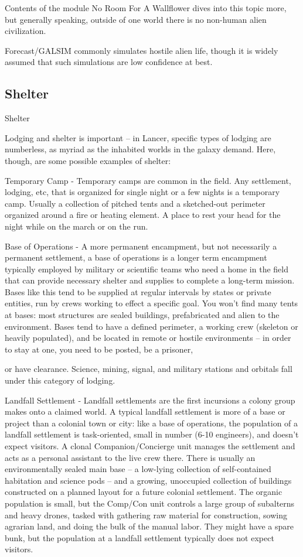 Contents of the module No Room For A Wallflower dives into this topic more, but generally
speaking, outside of one world there is no non-human alien civilization.


Forecast/GALSIM commonly simulates hostile alien life, though it is widely assumed that such
simulations are low confidence at best.

\subsection{Shelter}
Shelter

Lodging and shelter is important -- in Lancer, specific types of lodging are numberless, as myriad
as the inhabited worlds in the galaxy demand. Here, though, are some possible examples of
shelter:


Temporary Camp - Temporary camps are common in the field. Any settlement, lodging, etc, that
is organized for single night or a few nights is a temporary camp. Usually a collection of pitched
tents and a sketched-out perimeter organized around a fire or heating element. A place to rest
your head for the night while on the march or on the run.


Base of Operations - A more permanent encampment, but not necessarily a permanent
settlement, a base of operations is a longer term encampment typically employed by military or
scientific teams who need a home in the field that can provide necessary shelter and supplies to
complete a long-term mission. Bases like this tend to be supplied at regular intervals by states or
private entities, run by crews working to effect a specific goal. You won’t find many tents at
bases: most structures are sealed buildings, prefabricated and alien to the environment. Bases
tend to have a defined perimeter, a working crew (skeleton or heavily populated), and be located
in remote or hostile environments -- in order to stay at one, you need to be posted, be a prisoner,




or have clearance. Science, mining, signal, and military stations and orbitals fall under this
category of lodging.


Landfall Settlement - Landfall settlements are the first incursions a colony group makes onto a
claimed world. A typical landfall settlement is more of a base or project than a colonial town or
city: like a base of operations, the population of a landfall settlement is task-oriented, small in
number (6-10 engineers), and doesn’t expect visitors. A clonal Companion/Concierge unit
manages the settlement and acts as a personal assistant to the live crew there. There is usually
an environmentally sealed main base -- a low-lying collection of self-contained habitation and
science pods -- and a growing, unoccupied collection of buildings constructed on a planned
layout for a future colonial settlement. The organic population is small, but the Comp/Con unit
controls a large group of subalterns and heavy drones, tasked with gathering raw material for
construction, sowing agrarian land, and doing the bulk of the manual labor. They might have a
spare bunk, but the population at a landfall settlement typically does not expect visitors.


